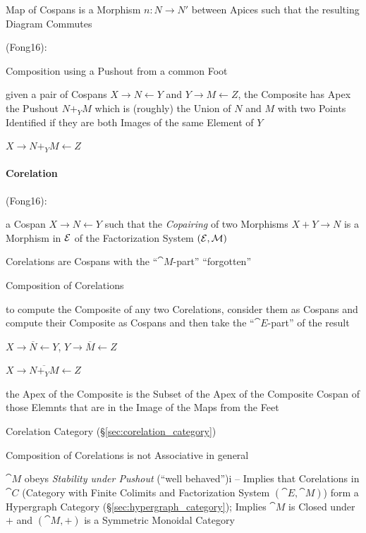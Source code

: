 Map of Cospans is a Morphism $n : N \rightarrow N'$ between Apices
such that the resulting Diagram Commutes

(Fong16):

Composition using a Pushout from a common Foot

given a pair of Cospans $X \rightarrow N \leftarrow Y$ and $Y
\rightarrow M \leftarrow Z$, the Composite has Apex the Pushout $N +_Y
M$ which is (roughly) the Union of $N$ and $M$ with two Points
Identified if they are both Images of the same Element of $Y$

$X \rightarrow N +_Y M \leftarrow Z$



\paragraph{Corelation}\label{sec:corelation}\hfill

(Fong16):

a Cospan $X \rightarrow N \leftarrow Y$ such that the \emph{Copairing}
of two Morphisms $X + Y \rightarrow N$ is a Morphism in $\mathcal{E}$ of
the Factorization System $(\mathcal{E}, \mathcal{M})$ %

Corelations are Cospans with the ``$\cat{M}$-part'' ``forgotten''

Composition of Corelations

to compute the Composite of any two Corelations, consider them as
Cospans and compute their Composite as Cospans and then take the
``$\cat{E}$-part'' of the result %

$X \rightarrow \overline{N} \leftarrow Y$, $Y \rightarrow \overline{M}
\leftarrow Z$

$X \rightarrow \overline{N +_Y M} \leftarrow Z$

the Apex of the Composite is the Subset of the Apex of the Composite
Cospan of those Elemnts that are in the Image of the Maps from the
Feet %

Corelation Category (\S\ref{sec:corelation_category})

Composition of Corelations is not Associative in general

$\cat{M}$ obeys \emph{Stability under Pushout} (``well behaved'')i --
Implies that Corelations in $\cat{C}$ (Category with Finite Colimits
and Factorization System $(\cat{E},\cat{M})$) form a Hypergraph
Category (\S\ref{sec:hypergraph_category}); Implies $\cat{M}$ is
Closed under $+$ and $(\cat{M},+)$ is a Symmetric Monoidal Category

